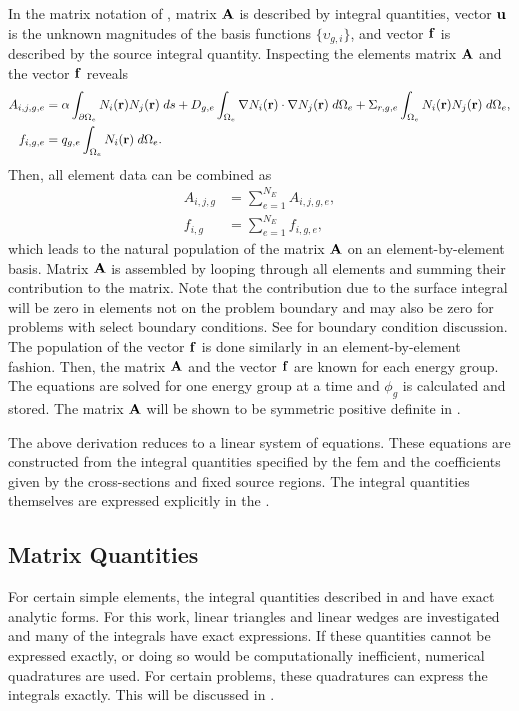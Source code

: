     In the matrix notation of , matrix $\mathbf{A}$ is 
    described by integral quantities, vector $\mathbf{u}$ is the unknown magnitudes of
    the basis functions $\{\upsilon_{g,i}\}$, and vector $\mathbf{f}$ is described by
    the source integral quantity. Inspecting the elements matrix $\mathbf{A}$ and the
    vector $\mathbf{f}$ reveals 
    \begin{align}
      \label{eq:matrix_population}
      A_{i,j,g,e} &= \alpha \int_{\partial \Omega_e} N_i(\mathbf{r}) 
        N_j(\mathbf{r}) \; ds + D_{g,e} 
        \int_{\Omega_e} \mathbf{\nabla} N_i(\mathbf{r}) \cdot \mathbf{\nabla} N_j(\mathbf{r}) \;
        d\Omega_e + \Sigma_{r,g,e} \int_{\Omega_e} N_i(\mathbf{r}) N_j(\mathbf{r})
        \; d\Omega_e, \\
      \label{eq:vector_population}
      f_{i,g,e} &= q_{g,e} \int_{\Omega_e} N_i(\mathbf{r}) \;d\Omega_e.
    \end{align}
    Then, all element data can be combined as
    \begin{align}
      A_{i,j,g} &= \sum_{e=1}^{N_E} A_{i,j,g,e}, \\
      f_{i,g} &=  \sum_{e=1}^{N_E} f_{i,g,e},
    \end{align}
    which leads to the natural population of the matrix $\mathbf{A}$ on an 
    element-by-element basis. Matrix $\mathbf{A}$ is assembled by looping
    through all elements and summing their contribution to the matrix. 
    Note that the contribution due to the surface integral will be zero in 
    elements not on the problem boundary and may also be zero for problems with
    select boundary conditions. See  for boundary
    condition discussion.  The population of the vector $\mathbf{f}$ is done similarly
    in an element-by-element fashion. Then, the matrix $\mathbf{A}$ and the vector 
    $\mathbf{f}$ are known for each energy group. The equations are solved for one
    energy group at a time and $\phi_g$ is calculated and stored. The matrix
    $\mathbf{A}$ will be shown to be symmetric positive definite in
    .
    
    The above derivation reduces to a linear system of
    equations. These equations are constructed from the integral quantities 
    specified by the \gls{fem} and the coefficients given by the cross-sections 
    and fixed source regions. The integral quantities themselves are expressed 
    explicitly in the .
    
  \subsection{Matrix Quantities}
    \label{sec:matrix_quantities}
    For certain simple elements, the integral quantities described in 
     and  have exact 
    analytic forms. For this work, linear triangles and linear wedges
    are investigated and many of the integrals have exact expressions. If these 
    quantities cannot be expressed exactly, or doing so would be computationally
    inefficient, numerical quadratures are used. For certain problems, these 
    quadratures can express the integrals exactly. This will be discussed in 
    .

